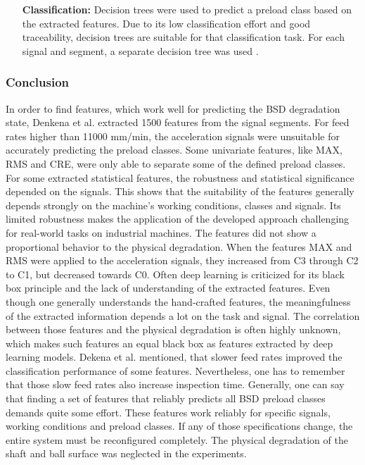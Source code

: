 \begin{itemize}
    \item [\textbf{Classification:}] Decision trees were used to predict a preload class based on the extracted features. Due to its low classification effort and good traceability, decision trees are suitable for that classification task. For each signal and segment, a separate decision tree was used \cite{Denkena2021}. 
\end{itemize}

\subsubsection{Conclusion}
In order to find features, which work well for predicting the BSD degradation state, Denkena et al. \cite{Denkena2021} extracted 1500 features from the signal segments. For feed rates higher than 11000 mm/min, the acceleration signals were unsuitable for accurately predicting the preload classes. Some univariate features, like MAX, RMS and CRE, were only able to separate some of the defined preload classes. For some extracted statistical features, the robustness and statistical significance depended on the signals. This shows that the suitability of the features generally depends strongly on the machine's working conditions, classes and signals.
Its limited robustness makes the application of the developed approach challenging for real-world tasks on industrial machines. The features did not show a proportional behavior to the physical degradation. When the features MAX and RMS were applied to the acceleration signals, they increased from C3 through C2 to C1, but decreased towards C0. Often deep learning is criticized for its black box principle and the lack of understanding of the extracted features. Even though one generally understands the hand-crafted features, the meaningfulness of the extracted information depends a lot on the task and signal. The correlation between those features and the physical degradation is often highly unknown, which makes such features an equal black box as features extracted by deep learning models. Dekena et al. \cite{Denkena2021} mentioned, that slower feed rates improved the classification performance of some features. Nevertheless, one has to remember that those slow feed rates also increase inspection time. Generally, one can say that finding a set of features that reliably predicts all BSD preload classes demands quite some effort. These features work reliably for specific signals, working conditions and preload classes. If any of those specifications change, 
the entire system must be reconfigured completely. The physical degradation of the shaft and ball surface was neglected in the experiments.

